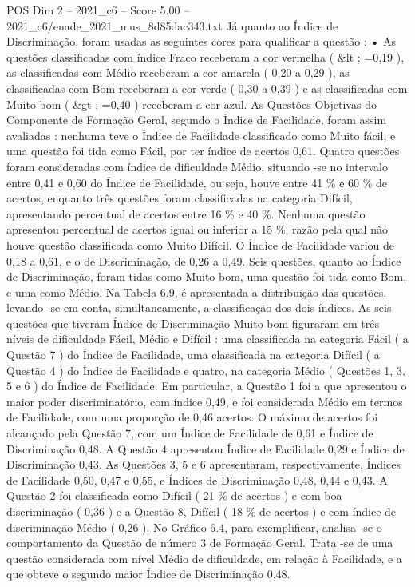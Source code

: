 \begin{textsample}{POS Dim 2 – 2021\_c6 – Score 5.00 – 2021\_c6/enade\_2021\_mus\_8d85dac343.txt}
Já quanto ao Índice de Discriminação, foram usadas as seguintes cores para qualificar a questão : • As questões classificadas com índice Fraco receberam a cor vermelha ( \&lt ; =0,19 ), as classificadas com Médio receberam a cor amarela ( 0,20 a 0,29 ), as classificadas com Bom receberam a cor verde ( 0,30 a 0,39 ) e as classificadas com Muito bom ( \&gt ; =0,40 ) receberam a cor azul.
As Questões Objetivas do Componente de Formação Geral, segundo o Índice de Facilidade, foram assim avaliadas : nenhuma teve o Índice de Facilidade classificado como Muito fácil, e uma questão foi tida como Fácil, por ter índice de acertos 0,61.
Quatro questões foram consideradas com índice de dificuldade Médio, situando -se no intervalo entre 0,41 e 0,60 do Índice de Facilidade, ou seja, houve entre 41 \% e 60 \% de acertos, enquanto três questões foram classificadas na categoria Difícil, apresentando percentual de acertos entre 16 \% e 40 \%.
Nenhuma questão apresentou percentual de acertos igual ou inferior a 15 \%, razão pela qual não houve questão classificada como Muito Difícil.
O Índice de Facilidade variou de 0,18 a 0,61, e o de Discriminação, de 0,26 a 0,49.
Seis questões, quanto ao Índice de Discriminação, foram tidas como Muito bom, uma questão foi tida como Bom, e uma como Médio.
Na Tabela 6.9, é apresentada a distribuição das questões, levando -se em conta, simultaneamente, a classificação dos dois índices.
As seis questões que tiveram Índice de Discriminação Muito bom figuraram em três níveis de dificuldade Fácil, Médio e Difícil : uma classificada na categoria Fácil ( a Questão 7 ) do Índice de Facilidade, uma classificada na categoria Difícil ( a Questão 4 ) do Índice de Facilidade e quatro, na categoria Médio ( Questões 1, 3, 5 e 6 ) do Índice de Facilidade.
Em particular, a Questão 1 foi a que apresentou o maior poder discriminatório, com índice 0,49, e foi considerada Médio em termos de Facilidade, com uma proporção de 0,46 acertos.
O máximo de acertos foi alcançado pela Questão 7, com um Índice de Facilidade de 0,61 e Índice de Discriminação 0,48.
A Questão 4 apresentou Índice de Facilidade 0,29 e Índice de Discriminação 0,43.
As Questões 3, 5 e 6 apresentaram, respectivamente, Índices de Facilidade 0,50, 0,47 e 0,55, e Índices de Discriminação 0,48, 0,44 e 0,43.
A Questão 2 foi classificada como Difícil ( 21 \% de acertos ) e com boa discriminação ( 0,36 ) e a Questão 8, Difícil ( 18 \% de acertos ) e com índice de discriminação Médio ( 0,26 ).
No Gráfico 6.4, para exemplificar, analisa -se o comportamento da Questão de número 3 de Formação Geral.
Trata -se de uma questão considerada com nível Médio de dificuldade, em relação à Facilidade, e a que obteve o segundo maior Índice de Discriminação 0,48.

\end{textsample}
